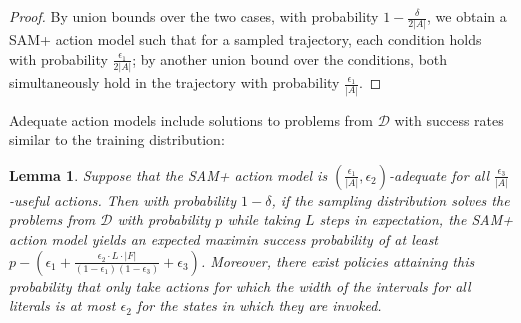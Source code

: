 \documentclass[letterpaper]{article} %
\newtheorem{lemma}{Lemma}
\begin{document}
\begin{proof}
By union bounds over the two cases, with probability $1-\frac{\delta}{2|A|}$, we obtain a SAM+ action model such that for a sampled trajectory, each condition holds with probability $\frac{\epsilon_1}{2|A|}$; by another union bound over the conditions, both simultaneously hold in the trajectory with probability $\frac{\epsilon_1}{|A|}$.
\end{proof}

\noindent
Adequate action models include solutions to problems from $\mathcal{D}$ with success rates similar to the training distribution:

\begin{lemma}\label{lem:sam-success}
Suppose that the SAM+ action model is $(\frac{\epsilon_1}{|A|},\epsilon_2)$-adequate for all $\frac{\epsilon_3}{|A|}$-useful actions. Then with probability $1-\delta$, if the sampling distribution solves the problems from $\mathcal{D}$ with probability $p$ while taking $L$ steps in expectation, the SAM+ action model yields an expected maximin success probability of at least $p-(\epsilon_1+\frac{\epsilon_2\cdot L\cdot |F|}{(1-\epsilon_1)(1-\epsilon_3)}+\epsilon_3)$.
Moreover, there exist policies attaining this probability that only take actions for which the width of the intervals for all literals is at most $\epsilon_2$ for the states in which they are invoked.
\end{lemma}
\end{document}
